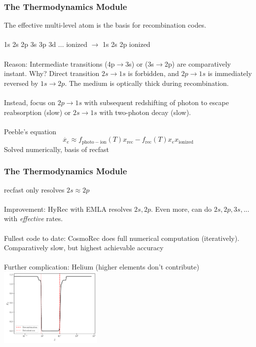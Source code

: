 \begin{frame}[fragile]
\frametitle{The Thermodynamics Module}

The {\Red effective multi-level atom} is the basis for recombination codes.\\ \mbox{}\\

1s 2s 2p 3s 3p 3d ... ionized $\to$ 1s 2s 2p ionized \\ \mbox{}\\

\pause
Reason: Intermediate transitions (4p$\to$3s) or (3s$\to$2p) are comparatively instant. Why? Direct transition $2s \to 1s$ is forbidden, and $2p \to 1s$ is immediately reversed by $1s \to 2p$. The medium is {\Red optically thick} during recombination.\\ \mbox{}\\

\pause
Instead, focus on $2p \to 1s$ with subsequent redshifting of photon to escape reabsorption (slow) or $2s \to 1s$ with two-photon decay (slow). \\ \mbox{}\\

{\Red Peeble's equation}
\begin{equation}
	\dot{x_e} \approx f_\mathrm{photo-ion}(T) x_\mathrm{rec}-f_\mathrm{rec}(T) x_e x_\mathrm{ionized} 
\end{equation}
Solved numerically, basis of {\Red recfast}
\end{frame}



\begin{frame}[fragile]
	\frametitle{The Thermodynamics Module}
	
	{\Red recfast} only resolves $2s \approx 2p$\\ \mbox{}\\
	\pause
	Improvement: {\Red HyRec} with EMLA resolves $2s,2p$. Even more, can do $2s,2p,3s,...$ with \textit{effective} rates.\\ \mbox{}\\
	
	Fullest code to date: {\Red CosmoRec} does full numerical computation (iteratively). Comparatively slow, but highest achievable accuracy\\ \mbox{}\\
	
	\pause
	Further complication: Helium (higher elements don't contribute)\\
	{\centering\includegraphics[width=5cm,angle=0]{Figures/xe.pdf}\\}
\end{frame}


